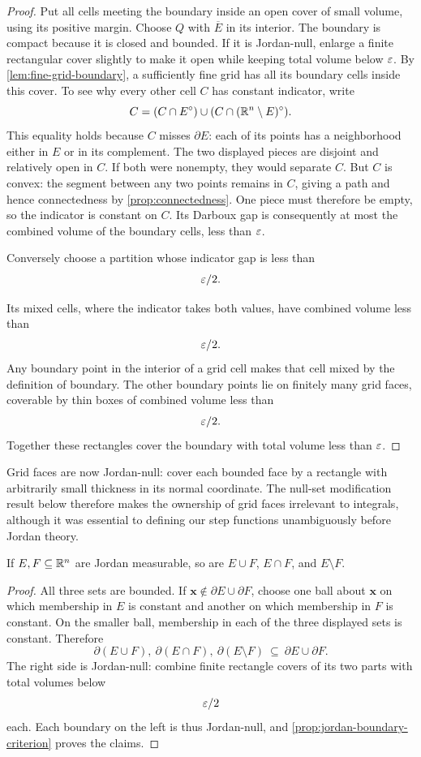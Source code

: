 \begin{proof}
Put all cells meeting the boundary inside an open cover
of small volume, using its positive margin. Choose $Q$ with $\overline E$
in its interior. The boundary is compact because it is closed and bounded.
If it is Jordan-null, enlarge a finite rectangular cover slightly to make
it open while keeping total volume below $\varepsilon$. By
\cref{lem:fine-grid-boundary}, a sufficiently fine grid has all its
boundary cells inside this cover. To see why every other cell $C$ has constant indicator, write
\[
C=(C\cap E^\circ)\cup(C\cap(\mathbb{R}^n\setminus E)^\circ).
\]
This equality holds because $C$ misses $\partial E$: each of its points
has a neighborhood either in $E$ or in its complement. The two displayed
pieces are disjoint and relatively open in $C$. If both were nonempty,
they would separate $C$. But $C$ is convex: the segment between any two
points remains in $C$, giving a path and hence connectedness by
\cref{prop:connectedness}. One piece must therefore be empty, so the
indicator is constant on $C$. Its Darboux gap is consequently
at most the combined volume of the boundary cells, less than $\varepsilon$.

Conversely choose a partition whose indicator gap is less than
\[
\varepsilon/2.
\]

Its mixed cells, where the indicator takes both values, have combined
volume less than
\[
\varepsilon/2.
\]
 Any boundary point in the interior of a
grid cell makes that cell mixed by the definition of boundary. The other
boundary points lie on finitely many grid faces, coverable by thin boxes
of combined volume less than
\[
\varepsilon/2.
\]
 Together these rectangles cover
the boundary with total volume less than $\varepsilon$.
\end{proof}

Grid faces are now Jordan-null: cover each bounded face by a rectangle
with arbitrarily small thickness in its normal coordinate. The null-set
modification result below therefore makes the ownership of grid faces
irrelevant to integrals, although it was essential to defining our step
functions unambiguously before Jordan theory.

\begin{proposition}\label{prop:jordan-set-algebra}
If $E,F\subseteq\mathbb{R}^n$ are Jordan measurable, so are
$E\cup F$, $E\cap F$, and $E\setminus F$.
\end{proposition}
\begin{proof}
All three sets are bounded. If $\mathbf{x}\notin\partial E\cup\partial F$, choose
one ball about $\mathbf{x}$ on which membership in $E$ is constant and another on
which membership in $F$ is constant. On the smaller ball, membership in
each of the three displayed sets is constant. Therefore
\[
\partial(E\cup F),\ \partial(E\cap F),\ \partial(E\setminus F)
\ \subseteq\ \partial E\cup\partial F.
\]
The right side is Jordan-null: combine finite rectangle covers of its two
parts with total volumes below
\[
\varepsilon/2
\]
 each. Each boundary on the left is
thus Jordan-null, and \cref{prop:jordan-boundary-criterion} proves the claims.
\end{proof}

